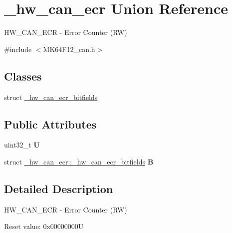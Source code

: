 \hypertarget{union__hw__can__ecr}{}\section{\+\_\+hw\+\_\+can\+\_\+ecr Union Reference}
\label{union__hw__can__ecr}


H\+W\+\_\+\+C\+A\+N\+\_\+\+E\+CR -\/ Error Counter (RW)  




{\ttfamily \#include $<$M\+K64\+F12\+\_\+can.\+h$>$}

\subsection*{Classes}
\begin{DoxyCompactItemize}
\item 
struct \hyperlink{struct__hw__can__ecr_1_1__hw__can__ecr__bitfields}{\+\_\+hw\+\_\+can\+\_\+ecr\+\_\+bitfields}
\end{DoxyCompactItemize}
\subsection*{Public Attributes}
\begin{DoxyCompactItemize}
\item 
uint32\+\_\+t {\bfseries U}\hypertarget{union__hw__can__ecr_ab8ef8aab31139ea76345b01f48ffb86b}{}\label{union__hw__can__ecr_ab8ef8aab31139ea76345b01f48ffb86b}

\item 
struct \hyperlink{struct__hw__can__ecr_1_1__hw__can__ecr__bitfields}{\+\_\+hw\+\_\+can\+\_\+ecr\+::\+\_\+hw\+\_\+can\+\_\+ecr\+\_\+bitfields} {\bfseries B}\hypertarget{union__hw__can__ecr_acd68cb6f405a5c1c398427d9b9ec4ea5}{}\label{union__hw__can__ecr_acd68cb6f405a5c1c398427d9b9ec4ea5}

\end{DoxyCompactItemize}


\subsection{Detailed Description}
H\+W\+\_\+\+C\+A\+N\+\_\+\+E\+CR -\/ Error Counter (RW) 

Reset value\+: 0x00000000U

